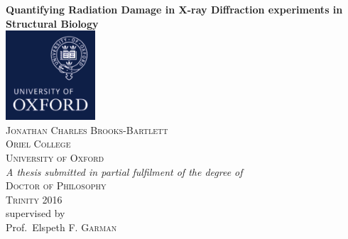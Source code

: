 \begin{titlepage}
	\centering
	{\huge\bfseries Quantifying Radiation Damage in X-ray Diffraction experiments in Structural Biology\\}
	\vspace{2.0cm}
	\includegraphics[width=0.25\textwidth]{figures/titlepage/ox_brand_cmyk_pos.pdf}\\
	\vspace{2.0cm}
	{\scshape\normalsize Jonathan Charles Brooks-Bartlett\\}
	{\scshape\normalsize Oriel College\\}
	{\scshape\normalsize University of Oxford\\}
	\vspace{1.0cm}
	{\normalsize\itshape A thesis submitted in partial fulfilment of the degree of\\}
	{\scshape\normalsize Doctor of Philosophy\\}
	{\scshape\normalsize Trinity 2016\\}
	\vspace{1.0cm}
	supervised by\\
	Prof.~Elspeth \textsc{F. Garman}
\end{titlepage}
